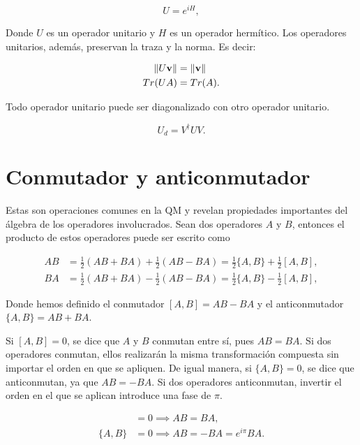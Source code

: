 \begin{equation}
    U = e^{iH} ,
\end{equation}

Donde $U$ es un operador unitario y $H$ es un operador hermítico. Los operadores unitarios, además, preservan la traza y la norma. Es decir:

\begin{align}
    \norm{U \mathbf{v}} &= \norm{\mathbf{v}} \\
    Tr(U A) &= Tr(A) .
\end{align}

Todo operador unitario puede ser diagonalizado con otro operador unitario.

\begin{equation}
    U_d = V^\dagger U V .
\end{equation}

\section{Conmutador y anticonmutador}

Estas son operaciones comunes en la QM y revelan propiedades importantes del álgebra de los operadores involucrados. Sean dos operadores $A$ y $B$, entonces el producto de estos operadores puede ser escrito como

\begin{align}
    A B &= \frac{1}{2} (AB + BA) + \frac{1}{2} (AB - BA) = \frac{1}{2} \{A,B\} + \frac{1}{2} [A,B], \\
    B A &= \frac{1}{2} (AB + BA) - \frac{1}{2} (AB - BA) = \frac{1}{2} \{A,B\} - \frac{1}{2} [A,B],
\end{align}

Donde hemos definido el conmutador $[A,B] = AB - BA$ y el anticonmutador $\{A,B\} = AB + BA$.

Si $[A,B] = 0$, se dice que $A$ y $B$ conmutan entre sí, pues $A B = B A$. Si dos operadores conmutan, ellos realizarán la misma transformación compuesta sin importar el orden en que se apliquen. De igual manera, si $\{A,B\} = 0$, se dice que anticonmutan, ya que $A B = -B A$. Si dos operadores anticonmutan, invertir el orden en el que se aplican introduce una fase de $\pi$.

\begin{align}
    [A,B] &= 0 \implies A B = B A, \\
    \{A,B\} &= 0 \implies A B = - B A = e^{i \pi} B A .
\end{align}

